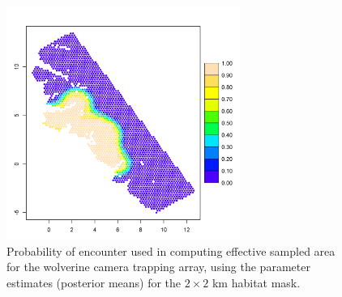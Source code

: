 {\begin{figure}[ht]
\begin{center}
\includegraphics[height=3in]{Ch4-SCR0/figs/wolv_esa}
\end{center}
\caption{Probability of encounter used in computing effective sampled area for the wolverine camera trapping
  array, using the parameter estimates (posterior means) for the $2
  \times 2$ km habitat mask.
}
\label{scr0.fig.esa}
\end{figure}


























}
